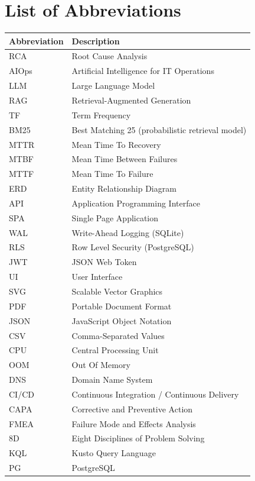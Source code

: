 \documentclass[12pt,a4paper,oneside]{report}
\begin{document}
\chapter*{List of Abbreviations}
\begin{longtable}{p{2.8cm} p{11.5cm}}
\toprule
\textbf{Abbreviation} & \textbf{Description}\\
\midrule
RCA & Root Cause Analysis\\
AIOps & Artificial Intelligence for IT Operations\\
LLM & Large Language Model\\
RAG & Retrieval-Augmented Generation\\
TF & Term Frequency\\
BM25 & Best Matching 25 (probabilistic retrieval model)\\
MTTR & Mean Time To Recovery\\
MTBF & Mean Time Between Failures\\
MTTF & Mean Time To Failure\\
ERD & Entity Relationship Diagram\\
API & Application Programming Interface\\
SPA & Single Page Application\\
WAL & Write-Ahead Logging (SQLite)\\
RLS & Row Level Security (PostgreSQL)\\
JWT & JSON Web Token\\
UI & User Interface\\
SVG & Scalable Vector Graphics\\
PDF & Portable Document Format\\
JSON & JavaScript Object Notation\\
CSV & Comma-Separated Values\\
CPU & Central Processing Unit\\
OOM & Out Of Memory\\
DNS & Domain Name System\\
CI/CD & Continuous Integration / Continuous Delivery\\
CAPA & Corrective and Preventive Action\\
FMEA & Failure Mode and Effects Analysis\\
8D & Eight Disciplines of Problem Solving\\
KQL & Kusto Query Language\\
PG & PostgreSQL\\
\bottomrule
\end{longtable}
\end{document}
